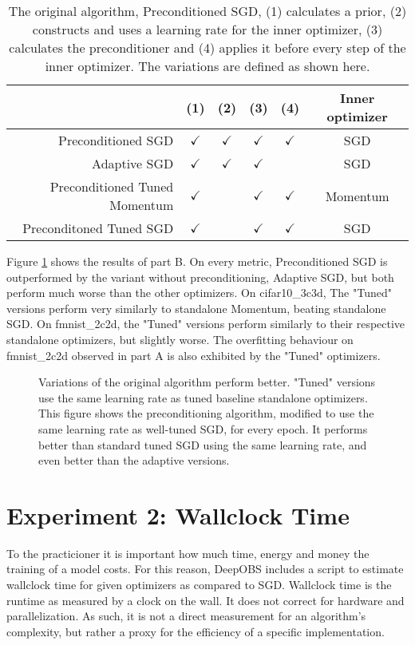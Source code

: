 \documentclass[twoside,12pt,a4paper]{report}
\begin{document}
\begin{table}[h]
	\centering
	\begin{tabular}{|r||c|c|c|c|c|}
		\hline 
		& (1) & (2) & (3) & (4) & Inner optimizer\\ 
		\hline 
		Preconditioned SGD & $\checkmark$ & $\checkmark$& $\checkmark$ & $\checkmark$ & SGD \\ 
		\hline 
		Adaptive SGD & $\checkmark$ & $\checkmark$ & $\checkmark$ & & SGD \\ 
		\hline 
		Preconditioned Tuned Momentum & $\checkmark$ & & $\checkmark$ & $\checkmark$ & Momentum \\ 
		\hline 
		Preconditoned Tuned SGD & $\checkmark$ &  & $\checkmark$ & $\checkmark$ & SGD \\ 
		\hline 
	\end{tabular}
	\caption{The original algorithm, Preconditioned SGD, (1) calculates a prior, (2) constructs and uses a learning rate for the inner optimizer, (3) calculates the preconditioner and (4) applies it before every step of the inner optimizer. The variations are defined as shown here.}
	\label{tab:exp_tunedalpha}
\end{table}

Figure \ref{fig:exp_tunedalpha} shows the results of part B. 
On every metric, Preconditioned SGD is outperformed by the variant without preconditioning, Adaptive SGD, but both perform much worse than the other optimizers.
On cifar10\_3c3d, The "Tuned" versions perform very similarly to standalone Momentum, beating standalone SGD. On fmnist\_2c2d, the "Tuned" versions perform similarly to their respective standalone optimizers, but slightly worse.
The overfitting behaviour on fmnist\_2c2d observed in part A is also exhibited by the "Tuned" optimizers.
\begin{figure}
		
		\caption{Variations of the original algorithm perform better. "Tuned" versions use the same learning rate as tuned baseline standalone optimizers.
			This figure shows the preconditioning algorithm, modified to use the same learning rate as well-tuned SGD, for every epoch. It performs better than standard tuned SGD using the same learning rate, and even better than the adaptive versions.}
		\label{fig:exp_tunedalpha}
\end{figure}

\section{Experiment 2: Wallclock Time}
To the practicioner it is important how much time, energy and money the training of a model costs. For this reason, DeepOBS includes a script to estimate wallclock time for given optimizers as compared to SGD. Wallclock time is the runtime as measured by a clock on the wall. It does not correct for hardware and parallelization. As such, it is not a direct measurement for an algorithm's complexity, but rather a proxy for the efficiency of a specific implementation.
\end{document}
